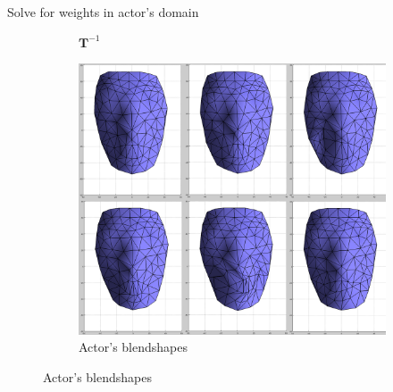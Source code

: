\documentclass{beamer}
\begin{document}
\begin{frame}{Solve for weights in actor's domain}
{\begin{figure}
\begin{subfigure}[b]{0.2\textwidth}
                \caption{\hspace{0.2cm} $\mathbf{T}^{-1}$}
        \end{subfigure}
        \begin{subfigure}[b]{0.3\textwidth}
                \includegraphics[width=\textwidth]{img/Rblends}
                \caption{Actor's blendshapes}
        \end{subfigure}
\end{figure}}

\end{frame}
\end{document}
